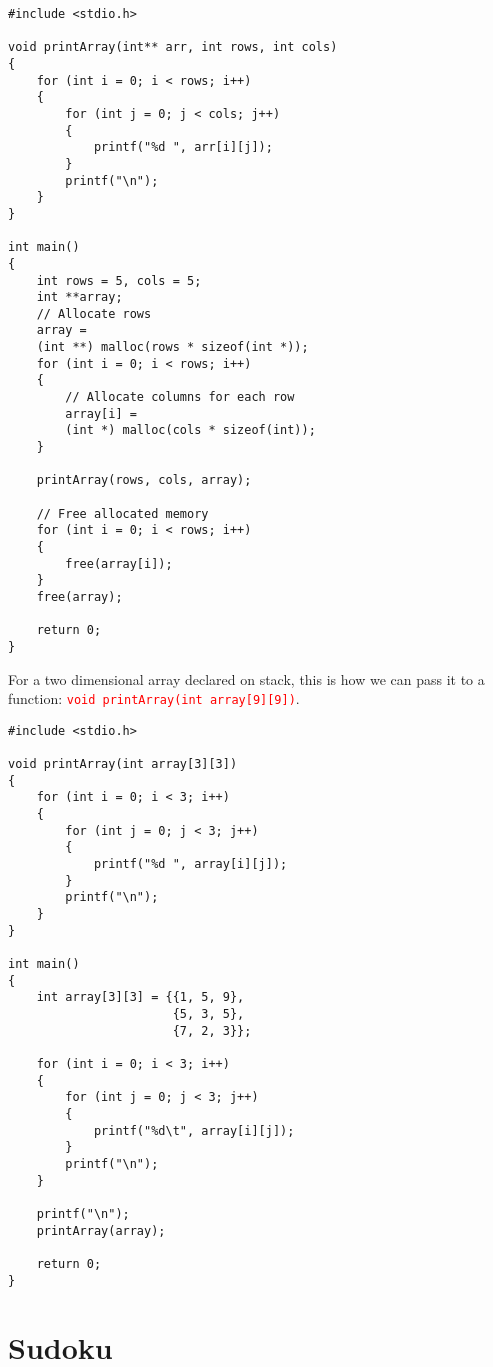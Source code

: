 \documentclass[12pt]{article}
\begin{document}
\begin{verbatim}
#include <stdio.h>

void printArray(int** arr, int rows, int cols)
{
    for (int i = 0; i < rows; i++)
    {
        for (int j = 0; j < cols; j++)
        {
            printf("%d ", arr[i][j]);
        }
        printf("\n");
    }
}

int main()
{
    int rows = 5, cols = 5;
    int **array;
    // Allocate rows
    array = 
    (int **) malloc(rows * sizeof(int *));
    for (int i = 0; i < rows; i++)
    {
        // Allocate columns for each row
        array[i] = 
        (int *) malloc(cols * sizeof(int));
    }

    printArray(rows, cols, array);

    // Free allocated memory
    for (int i = 0; i < rows; i++)
    {
        free(array[i]);
    }
    free(array);

    return 0;   
}
\end{verbatim}

\newpage

\noindent For a two dimensional array declared on stack, this is how we can pass it to a function: \textcolor{red}{\texttt{void printArray(int array[9][9])}}. \\

\begin{verbatim}
#include <stdio.h>

void printArray(int array[3][3])
{
    for (int i = 0; i < 3; i++)
    {
        for (int j = 0; j < 3; j++)
        {
            printf("%d ", array[i][j]);
        }
        printf("\n");
    }
}

int main()
{
    int array[3][3] = {{1, 5, 9}, 
                       {5, 3, 5}, 
                       {7, 2, 3}};

    for (int i = 0; i < 3; i++)
    {
        for (int j = 0; j < 3; j++)
        {
            printf("%d\t", array[i][j]);
        }
        printf("\n");
    }

	printf("\n");
	printArray(array);

    return 0;
}
\end{verbatim}

\newpage

\newpage
{}
\section*{Sudoku}
\end{document}
